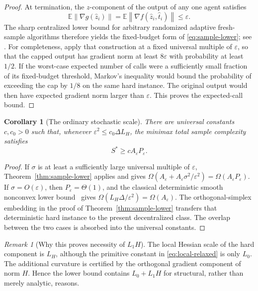 \documentclass[11pt,a4paper]{article}
\newcommand{\E}{\mathbb{E}}
\newcommand{\eps}{\varepsilon}
\newcommand{\norm}[1]{\left\lVert #1\right\rVert}
\newtheorem{corollary}[theorem]{Corollary}
\theoremstyle{remark}
\newtheorem{remark}[theorem]{Remark}
\begin{document}
\begin{proof}
At termination, the $z$-component of the output of any one agent satisfies
\[
 \E\norm{\nabla g(\widehat z_i)}
 =\E\norm{\nabla f(\widehat z_i,\widehat t_i)}
 \le\eps.
\]
The sharp centralized lower bound for arbitrary randomized adaptive
fresh-sample algorithms therefore yields the fixed-budget form of
\eqref{eq:sample-lower}; see \cite[Theorem~3 and its fixed-budget construction]{arjevani2022}.  For completeness, apply that construction at a fixed universal multiple of
$\eps$, so that the capped output has gradient norm at least $8\eps$ with
probability at least $1/2$. If the worst-case expected number of calls were
a sufficiently small fraction of its fixed-budget threshold, Markov's
inequality would bound the probability of exceeding the cap by $1/8$ on
the same hard instance. The original output would then have expected
gradient norm larger than $\eps$. This proves the expected-call bound.
\end{proof}

\begin{corollary}[The ordinary stochastic scale]
\label{cor:AP-lower}
There are universal constants $c,c_0>0$ such that, whenever
$\eps^2\le c_0\Delta L_H$, the minimax total sample complexity satisfies
\begin{equation}
 S^*\ge cA_\eps P_\eps.
 \label{eq:AP-lower}
\end{equation}
\end{corollary}

\begin{proof}
If $\sigma$ is at least a sufficiently large universal multiple of $\eps$,
Theorem~\ref{thm:sample-lower} applies and gives
$\Omega(A_\eps+A_\eps\sigma^2/\eps^2)=\Omega(A_\eps P_\eps)$.
If $\sigma=O(\eps)$, then $P_\eps=\Theta(1)$, and the classical deterministic
smooth nonconvex lower bound~\cite{carmon2019} gives $\Omega(L_H\Delta/\eps^2)=\Omega(A_\eps)$.
The orthogonal-simplex embedding in the proof of
Theorem~\ref{thm:sample-lower} transfers that deterministic hard instance to
the present decentralized class.  The overlap between the two cases is
absorbed into the universal constants.
\end{proof}

\begin{remark}[Why this proves necessity of $L_1H$]
The local Hessian scale of the hard component is $L_H$, although the primitive
constant in \eqref{eq:local-relaxed} is only $L_0$.  The additional curvature is
certified by the orthogonal gradient component of norm $H$.  Hence the lower
bound contains $L_0+L_1H$ for structural, rather than merely analytic,
reasons.
\end{remark}
\end{document}
